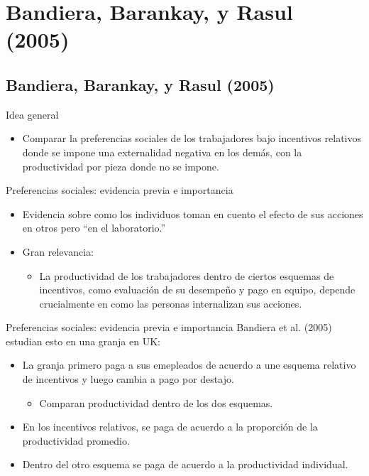 \documentclass[11pt, aspectratio=169, compress]{beamer}
\begin{document}
\section{Bandiera, Barankay, y Rasul (2005)}
\subsection{Bandiera, Barankay, y Rasul (2005)}
\begin{frame}{Idea general}
	\begin{itemize}
		\item Comparar la preferencias sociales de los trabajadores bajo incentivos relativos donde se impone una externalidad negativa en los demás, con la productividad por pieza donde no se impone. 
	\end{itemize}
\end{frame}
\begin{frame}{Preferencias sociales: evidencia previa e importancia} 
\begin{itemize}
	\item Evidencia sobre como los individuos toman en cuento el efecto de sus acciones en otros pero ``en el laboratorio.''
	\item Gran relevancia:  
	\begin{itemize}
		\item La productividad de los trabajadores dentro de ciertos esquemas de incentivos, como evaluación de su desempeño y pago en equipo, depende crucialmente en como las personas internalizan sus acciones. 
	\end{itemize} 
\end{itemize}
\end{frame}
\begin{frame}{Preferencias sociales: evidencia previa e importancia} 
Bandiera et al. (2005) estudian esto en una granja en UK: 
\begin{itemize}
	\item La granja primero paga a sus emepleados de acuerdo a une esquema relativo de incentivos y luego cambia a pago por destajo. 
	\begin{itemize}
		\item Comparan productividad dentro de los dos esquemas. 
	\end{itemize}
	\item En los incentivos relativos, se paga de acuerdo a la proporción de la productividad promedio. 
	\item Dentro del otro esquema se paga de acuerdo a la productividad individual. 
\end{itemize}
\end{frame}
\end{document}
